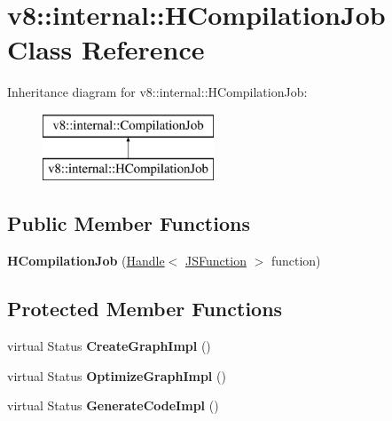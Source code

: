 \hypertarget{classv8_1_1internal_1_1_h_compilation_job}{}\section{v8\+:\+:internal\+:\+:H\+Compilation\+Job Class Reference}
\label{classv8_1_1internal_1_1_h_compilation_job}
Inheritance diagram for v8\+:\+:internal\+:\+:H\+Compilation\+Job\+:\begin{figure}[H]
\begin{center}
\leavevmode
\includegraphics[height=2.000000cm]{classv8_1_1internal_1_1_h_compilation_job}
\end{center}
\end{figure}
\subsection*{Public Member Functions}
\begin{DoxyCompactItemize}
\item 
{\bfseries H\+Compilation\+Job} (\hyperlink{classv8_1_1internal_1_1_handle}{Handle}$<$ \hyperlink{classv8_1_1internal_1_1_j_s_function}{J\+S\+Function} $>$ function)\hypertarget{classv8_1_1internal_1_1_h_compilation_job_ad8d7483e4f59bfbfaaff0af966df2df4}{}\label{classv8_1_1internal_1_1_h_compilation_job_ad8d7483e4f59bfbfaaff0af966df2df4}

\end{DoxyCompactItemize}
\subsection*{Protected Member Functions}
\begin{DoxyCompactItemize}
\item 
virtual Status {\bfseries Create\+Graph\+Impl} ()\hypertarget{classv8_1_1internal_1_1_h_compilation_job_a20c8082403c7e445cad415919890025c}{}\label{classv8_1_1internal_1_1_h_compilation_job_a20c8082403c7e445cad415919890025c}

\item 
virtual Status {\bfseries Optimize\+Graph\+Impl} ()\hypertarget{classv8_1_1internal_1_1_h_compilation_job_a09870023ced6fdfb97116d27198f7586}{}\label{classv8_1_1internal_1_1_h_compilation_job_a09870023ced6fdfb97116d27198f7586}

\item 
virtual Status {\bfseries Generate\+Code\+Impl} ()\hypertarget{classv8_1_1internal_1_1_h_compilation_job_aa651aaffa22c07c3c2095dd35ceec0fe}{}\label{classv8_1_1internal_1_1_h_compilation_job_aa651aaffa22c07c3c2095dd35ceec0fe}

\end{DoxyCompactItemize}
